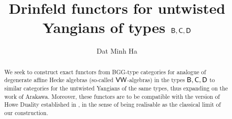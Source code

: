 

\setcounter{section}{-1}





    \title{\texorpdfstring{Drinfeld functors for untwisted Yangians of types $\mathsf{B}, \mathsf{C}, \mathsf{D}$}{}}
    
    \author{Dat Minh Ha}
    \maketitle
    
    \begin{abstract}
        We seek to construct exact functors from BGG-type categories for analogue of degenerate affine Hecke algebras (so-called $\mathsf{VW}$-algebras) in the types $\mathsf{B}, \mathsf{C}, \mathsf{D}$ to similar categories for the untwisted Yangians of the same types, thus expanding on the work \cite{arakawa_drinfeld_functors} of Arakawa. Moreover, these functors are to be compatible with the version of Howe Duality established in \cite{ehrig_stroppel_nazarov_wenzl_algebras_and_categorified_skew_howe_duality}, in the sense of being realisable as the classical limit of our construction.
    \end{abstract}
    
    {
    \hypersetup{} 
    \tableofcontents %
    }

    

    

    

    \begin{appendices}
        
    \end{appendices}
    
    \printbibliography

